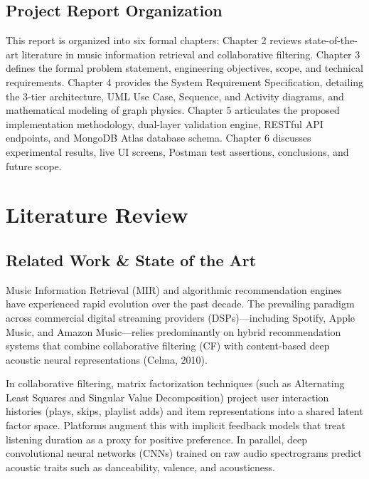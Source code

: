 \documentclass[12pt,a4paper,oneside]{report}
\begin{document}
\section{Project Report Organization}
This report is organized into six formal chapters: Chapter 2 reviews state-of-the-art literature in music information retrieval and collaborative filtering. Chapter 3 defines the formal problem statement, engineering objectives, scope, and technical requirements. Chapter 4 provides the System Requirement Specification, detailing the 3-tier architecture, UML Use Case, Sequence, and Activity diagrams, and mathematical modeling of graph physics. Chapter 5 articulates the proposed implementation methodology, dual-layer validation engine, RESTful API endpoints, and MongoDB Atlas database schema. Chapter 6 discusses experimental results, live UI screens, Postman test assertions, conclusions, and future scope.

\chapter{Literature Review}

\section{Related Work \& State of the Art}
Music Information Retrieval (MIR) and algorithmic recommendation engines have experienced rapid evolution over the past decade. The prevailing paradigm across commercial digital streaming providers (DSPs)---including Spotify, Apple Music, and Amazon Music---relies predominantly on hybrid recommendation systems that combine collaborative filtering (CF) with content-based deep acoustic neural representations (Celma, 2010).

In collaborative filtering, matrix factorization techniques (such as Alternating Least Squares and Singular Value Decomposition) project user interaction histories (plays, skips, playlist adds) and item representations into a shared latent factor space. Platforms augment this with implicit feedback models that treat listening duration as a proxy for positive preference. In parallel, deep convolutional neural networks (CNNs) trained on raw audio spectrograms predict acoustic traits such as danceability, valence, and acousticness.
\end{document}
